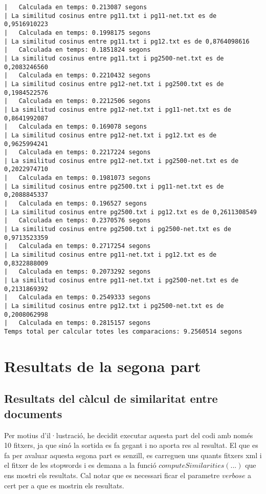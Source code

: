 \documentclass{report}
\begin{document}
\begin{verbatim}
|	Calculada en temps: 0.213087 segons
| La similitud cosinus entre pg11.txt i pg11-net.txt es de 0,9516910223
|	Calculada en temps: 0.1998175 segons
| La similitud cosinus entre pg11.txt i pg12.txt es de 0,8764098616
|	Calculada en temps: 0.1851824 segons
| La similitud cosinus entre pg11.txt i pg2500-net.txt es de 0,2083246560
|	Calculada en temps: 0.2210432 segons
| La similitud cosinus entre pg12-net.txt i pg2500.txt es de 0,1984522576
|	Calculada en temps: 0.2212506 segons
| La similitud cosinus entre pg12-net.txt i pg11-net.txt es de 0,8641992087
|	Calculada en temps: 0.169078 segons
| La similitud cosinus entre pg12-net.txt i pg12.txt es de 0,9625994241
|	Calculada en temps: 0.2217224 segons
| La similitud cosinus entre pg12-net.txt i pg2500-net.txt es de 0,2022974710
|	Calculada en temps: 0.1981073 segons
| La similitud cosinus entre pg2500.txt i pg11-net.txt es de 0,2088845337
|	Calculada en temps: 0.196527 segons
| La similitud cosinus entre pg2500.txt i pg12.txt es de 0,2611308549
|	Calculada en temps: 0.2370576 segons
| La similitud cosinus entre pg2500.txt i pg2500-net.txt es de 0,9713523359
|	Calculada en temps: 0.2717254 segons
| La similitud cosinus entre pg11-net.txt i pg12.txt es de 0,8322888009
|	Calculada en temps: 0.2073292 segons
| La similitud cosinus entre pg11-net.txt i pg2500-net.txt es de 0,2131869392
|	Calculada en temps: 0.2549333 segons
| La similitud cosinus entre pg12.txt i pg2500-net.txt es de 0,2008062998
|	Calculada en temps: 0.2815157 segons
Temps total per calcular totes les comparacions: 9.2560514 segons

\end{verbatim}

\newpage

\section{Resultats de la segona part}

\subsection{Resultats del càlcul de similaritat entre documents}

Per motius d'il·lustració, he decidit executar aquesta part del codi amb només 10 fitxers, ja que sinó la sortida es fa gegant i no aporta res al resultat. El que es fa per avaluar aquesta segona part es senzill, es carreguen uns quants fitxers xml i el fitxer de les stopwords i es demana a la funció $computeSimilarities(...)$ que ens mostri els resultats. Cal notar que es necessari ficar el parametre $verbose$ a cert per a que es mostrin els resultats.
\end{document}
